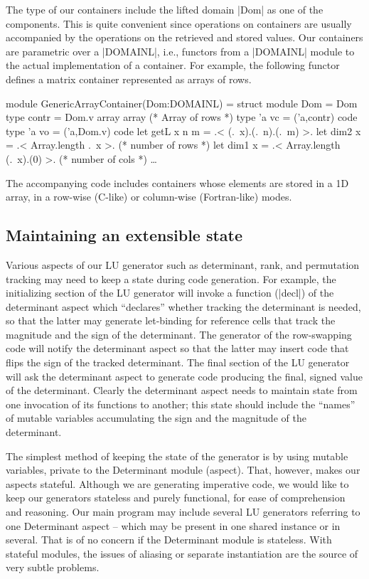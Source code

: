 \documentclass{elsart}
\begin{document}
The type of our containers include the lifted domain |Dom| as one of
the components. This is quite convenient since operations on containers
are usually accompanied by the operations on the retrieved and stored
values. Our containers are parametric over a |DOMAINL|, i.e., functors
from a |DOMAINL| module to the actual implementation of a
container. For example, the following functor defines a matrix
container represented as arrays of rows.

\begin{code}
module GenericArrayContainer(Dom:DOMAINL) =
  struct
  module Dom = Dom
  type contr = Dom.v array array (* Array of rows *)
  type 'a vc = ('a,contr) code
  type 'a vo = ('a,Dom.v) code
  let getL x n m = .< (.~x).(.~n).(.~m) >.
  let dim2 x = .< Array.length .~x >.       (* number of rows *)
  let dim1 x = .< Array.length (.~x).(0) >. (* number of cols *)
  \dots
\end{code}
%
The accompanying code\cite{metamonadsURL} includes containers whose
elements are stored in a 1D array, in a
row-wise (C-like) or column-wise (Fortran-like) modes.

\subsection{Maintaining an extensible state}

Various aspects of our LU generator such as determinant, rank, 
and permutation tracking may need to keep a state during
code generation. For example, the initializing section of the LU
generator will invoke a function (|decl|) of the determinant aspect 
which ``declares'' whether tracking the determinant is needed, 
so that the
latter may generate let-binding for reference cells that track the
magnitude and the sign of the determinant. The generator of the
row-swapping code will notify the determinant aspect so that the
latter may insert code that flips the sign of the tracked
determinant. The final section of the LU generator will ask the
determinant aspect to generate code producing the final, signed value
of the determinant. Clearly the determinant aspect needs to maintain
state from one invocation of its functions to another; this state should
include the ``names'' of mutable variables accumulating the sign and the
magnitude of the determinant.

The simplest method of keeping the state of the generator is by using
mutable variables, private to the Determinant module (aspect). That,
however, makes our aspects stateful. Although we are generating
imperative code, we would like to keep our generators stateless and
purely functional, for ease of comprehension and reasoning.  Our main
program may include several LU generators referring to one Determinant
aspect -- which may be present in one shared instance or in
several. That is of no concern if the Determinant module is
stateless. With stateful modules, the issues of aliasing or separate
instantiation are the source of very subtle problems.
\end{document}
